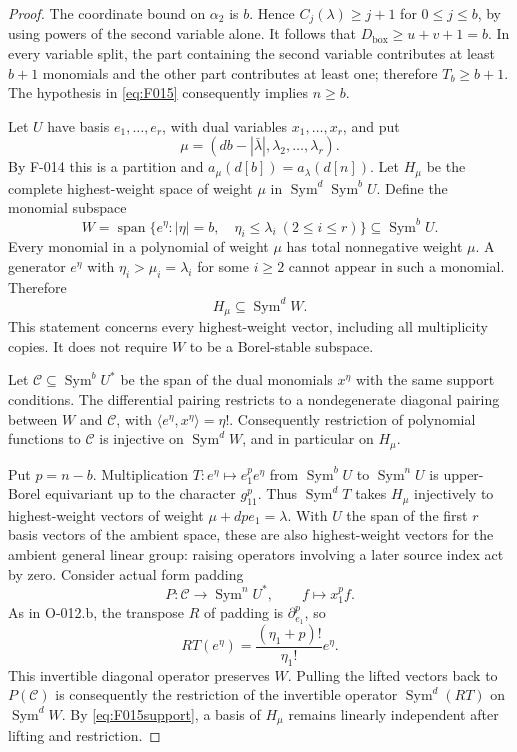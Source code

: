 \begin{proof}
The coordinate bound on \(\alpha_2\) is \(b\). Hence
\(C_j(\lambda)\geq j+1\) for \(0\leq j\leq b\), by
using powers of the second variable alone. It follows that
\(D_{\mathrm{box}}\geq u+v+1=b\). In every variable split,
the part containing the second variable contributes at least
\(b+1\) monomials and the other part contributes at least one;
therefore \(T_b\geq b+1\). The hypothesis in
\eqref{eq:F015} consequently implies \(n\geq b\).

Let \(U\) have basis \(e_1,\ldots,e_r\), with dual variables
\(x_1,\ldots,x_r\), and put
\[
       \mu=(db-|\bar\lambda|,\lambda_2,\ldots,\lambda_r).
\]
By F-014 this is a partition and
\(a_\mu(d[b])=a_\lambda(d[n])\).
Let \(H_\mu\) be the complete highest-weight space of weight
\(\mu\) in \(\operatorname{Sym}^d\operatorname{Sym}^b U\).
Define the monomial subspace
\[
 W=\operatorname{span}\{e^\eta:|\eta|=b,\quad
                    \eta_i\leq\lambda_i\ (2\leq i\leq r)\}
                  \subseteq\operatorname{Sym}^b U.
\]
Every monomial in a polynomial of weight \(\mu\) has total
nonnegative weight \(\mu\). A generator \(e^\eta\) with
\(\eta_i>\mu_i=\lambda_i\) for some \(i\geq2\) cannot
appear in such a monomial. Therefore
\begin{equation}\label{eq:F015support}
                         H_\mu\subseteq\operatorname{Sym}^d W.
\end{equation}
This statement concerns every highest-weight vector, including
all multiplicity copies. It does not require \(W\) to be a
Borel-stable subspace.

Let \(\mathcal C\subseteq\operatorname{Sym}^b U^*\) be the
span of the dual monomials \(x^\eta\) with the same support
conditions. The differential pairing restricts to a nondegenerate
diagonal pairing between \(W\) and \(\mathcal C\), with
\(\langle e^\eta,x^\eta\rangle=\eta!\).
Consequently restriction of polynomial functions to
\(\mathcal C\) is injective on \(\operatorname{Sym}^d W\),
and in particular on \(H_\mu\).

Put \(p=n-b\). Multiplication
\(T:e^\eta\mapsto e_1^p e^\eta\) from
\(\operatorname{Sym}^b U\) to \(\operatorname{Sym}^n U\)
is upper-Borel equivariant up to the character \(g_{11}^p\).
Thus \(\operatorname{Sym}^d T\) takes \(H_\mu\) injectively
to highest-weight vectors of weight
\(\mu+dp e_1=\lambda\).
With \(U\) the span of the first \(r\) basis vectors of the
ambient space, these are also highest-weight vectors for the
ambient general linear group: raising operators involving a
later source index act by zero.
Consider actual form padding
\[
                 P:\mathcal C\longrightarrow
                       \operatorname{Sym}^n U^*,\qquad
                         f\longmapsto x_1^p f.
\]
As in O-012.b, the transpose \(R\) of padding is
\(\partial_{e_1}^p\), so
\[
                 RT(e^\eta)
                   =\frac{(\eta_1+p)!}{\eta_1!}e^\eta.
\]
This invertible diagonal operator preserves \(W\). Pulling
the lifted vectors back to \(P(\mathcal C)\) is consequently
the restriction of the invertible operator
\(\operatorname{Sym}^d(RT)\) on \(\operatorname{Sym}^d W\).
By \eqref{eq:F015support}, a basis of \(H_\mu\) remains
linearly independent after lifting and restriction.


\end{proof}
